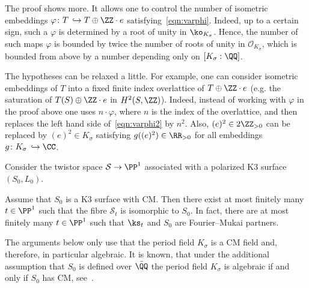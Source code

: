 \begin{rema}\label{rem:finiteunity}
The proof shows more. It allows one to control the number of isometric embeddings $\varphi\colon T\,\hookrightarrow T\oplus\ZZ\cdot e$ satisfying~\eqref{eqn:varphi}. Indeed, up to a certain sign, such a $\varphi$ is determined by a root of unity in $\ko_{K_\sigma}$. Hence, the number of such maps $\varphi$ is bounded by twice the number of roots of unity in ${\mathcal O}_{K_\sigma}$, which is bounded from above by a number depending only on $[K_\sigma:\QQ]$.
\end{rema}

\begin{rema}\label{rem:relax}
The hypotheses can be relaxed a little. For example, one can consider isometric embeddings of $T$ into a fixed finite index overlattice of $T\oplus\ZZ\cdot e$ (e.g. the saturation of $T(S)\oplus\ZZ\cdot e$ in $H^2(S,\ZZ)$). Indeed, instead of working with $\varphi$ in the proof above one uses $n\cdot \varphi$, where $n$ is the index of the overlattice, and then replaces the left hand side of~\eqref{eqn:varphi2} by $n^2$. Also, $(e)^2\in2\ZZ_{>0}$ can be replaced by $(e)^2\in K_\sigma$ satisfying $g((e)^2)\in\RR_{>0}$ for all embeddings $g\colon K_\sigma\,\hookrightarrow\CC$.
\end{rema}

Consider the twistor space ${\mathcal S}\to\PP^1$ associated with a polarized K3 surface $(S_0,L_0)$.

\begin{prop}\label{prop:finitetwistor}
Assume that $S_0$ is a K3 surface with CM. Then there exist at most finitely many $t\in\PP^1$ such that the fibre ${\mathcal S}_t$ is isomorphic to $S_0$. In fact, there are at most finitely many $t\in\PP^1$ such that $\ks_t$ and $S_0$ are Fourier--Mukai partners.
\end{prop}

The arguments below only use that the period field $K_\sigma$ is a CM field and, therefore, in particular algebraic. It is known, that under the additional assumption that $S_0$ is defined over $\bar\QQ$ the period field $K_\sigma$ is algebraic if and only if $S_0$ has CM, see~\cite{Tret}.

